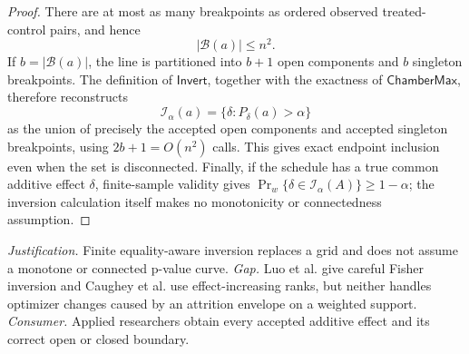 \documentclass{article}
\begin{document}
\begin{proof}
There are at most as many breakpoints as ordered observed treated-control pairs, and hence
\[
|\mathcal B(a)|\le n^2.
\]
If \(b=|\mathcal B(a)|\), the line is partitioned into \(b+1\) open components and \(b\) singleton breakpoints.  The definition of \(\mathsf{Invert}\), together with the exactness of \(\mathsf{ChamberMax}\), therefore reconstructs
\[
\mathcal I_\alpha(a)=\{\delta:P_\delta(a)>\alpha\}
\]
as the union of precisely the accepted open components and accepted singleton breakpoints, using \(2b+1=O(n^2)\) calls.  This gives exact endpoint inclusion even when the set is disconnected.  Finally, if the schedule has a true common additive effect \(\delta\), finite-sample validity gives
\(\Pr_w\{\delta\in\mathcal I_\alpha(A)\}\ge1-\alpha\); the inversion calculation itself makes no monotonicity or connectedness assumption.
\end{proof}
\par\smallskip\noindent \textit{Justification.} Finite equality-aware inversion replaces a grid and does not assume a monotone or connected p-value curve. \textit{Gap.} Luo et al. give careful Fisher inversion and Caughey et al. use effect-increasing ranks, but neither handles optimizer changes caused by an attrition envelope on a weighted support. \textit{Consumer.} Applied researchers obtain every accepted additive effect and its correct open or closed boundary.
\end{document}
